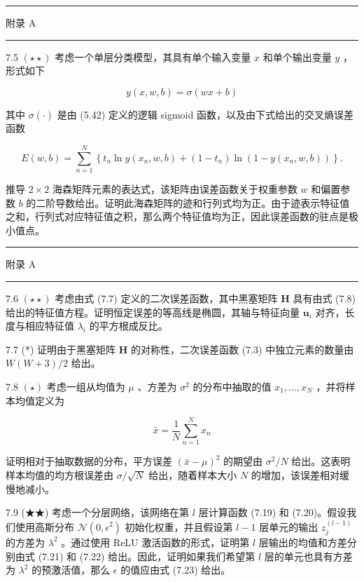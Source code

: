 \documentclass[10pt]{article}
\newcommand{\HRule}{\begin{center}\rule{0.9\linewidth}{0.2mm}\end{center}}
\begin{document}
\HRule

附录 A

\HRule

7.5 \(\left( {\star  \star  }\right)\) 考虑一个单层分类模型，其具有单个输入变量 \(x\) 和单个输出变量 \(y\) ，形式如下

\[
y\left( {x,w,b}\right)  = \sigma \left( {{wx} + b}\right)  \tag{7.63}
\]

其中 \(\sigma \left( \cdot \right)\) 是由 (5.42) 定义的逻辑 sigmoid 函数，以及由下式给出的交叉熵误差函数

\[
E\left( {w,b}\right)  = \mathop{\sum }\limits_{{n = 1}}^{N}\left\{  {{t}_{n}\ln y\left( {{x}_{n},w,b}\right)  + \left( {1 - {t}_{n}}\right) \ln \left( {1 - y\left( {{x}_{n},w,b}\right) }\right) }\right\}  . \tag{7.64}
\]

推导 \(2 \times  2\) 海森矩阵元素的表达式，该矩阵由误差函数关于权重参数 \(w\) 和偏置参数 \(b\) 的二阶导数给出。证明此海森矩阵的迹和行列式均为正。由于迹表示特征值之和，行列式对应特征值之积，那么两个特征值均为正，因此误差函数的驻点是极小值点。

\HRule

附录 A

\HRule

7.6 \(\left( {\star  \star  }\right)\) 考虑由式 (7.7) 定义的二次误差函数，其中黑塞矩阵 \(\mathbf{H}\) 具有由式 (7.8) 给出的特征值方程。证明恒定误差的等高线是椭圆，其轴与特征向量 \({\mathbf{u}}_{i}\) 对齐，长度与相应特征值 \({\lambda }_{i}\) 的平方根成反比。

7.7 (*) 证明由于黑塞矩阵 \(\mathbf{H}\) 的对称性，二次误差函数 (7.3) 中独立元素的数量由 \(W\left( {W + 3}\right) /2\) 给出。

7.8 \(\left( \star \right)\) 考虑一组从均值为 \(\mu\) 、方差为 \({\sigma }^{2}\) 的分布中抽取的值 \({x}_{1},\ldots ,{x}_{N}\) ，并将样本均值定义为

\[
\bar{x} = \frac{1}{N}\mathop{\sum }\limits_{{n = 1}}^{N}{x}_{n} \tag{7.65}
\]

证明相对于抽取数据的分布，平方误差 \({\left( \bar{x} - \mu \right) }^{2}\) 的期望由 \({\sigma }^{2}/N\) 给出。这表明样本均值的均方根误差由 \(\sigma /\sqrt{N}\) 给出，随着样本大小 \(N\) 的增加，该误差相对缓慢地减小。

7.9 (★★) 考虑一个分层网络，该网络在第 \(l\) 层计算函数 (7.19) 和 (7.20)。假设我们使用高斯分布 \(\mathcal{N}\left( {0,{\epsilon }^{2}}\right)\) 初始化权重，并且假设第 \(l - 1\) 层单元的输出 \({z}_{j}^{\left( l - 1\right) }\) 的方差为 \({\lambda }^{2}\) 。通过使用 ReLU 激活函数的形式，证明第 \(l\) 层输出的均值和方差分别由式 (7.21) 和 (7.22) 给出。因此，证明如果我们希望第 \(l\) 层的单元也具有方差为 \({\lambda }^{2}\) 的预激活值，那么 \(\epsilon\) 的值应由式 (7.23) 给出。
\end{document}
